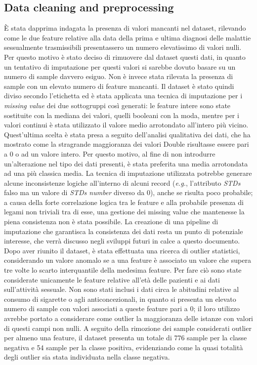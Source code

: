 \subsection{Data cleaning and preprocessing}
È stata dapprima indagata la presenza di valori mancanti nel dataset, rilevando come le due feature relative alla data della prima e ultima diagnosi delle malattie sessualmente trasmissibili presentassero un numero elevatissimo di valori nulli.
Per questo motivo è stato deciso di rimuovere dal dataset questi dati, in quanto un tentativo di imputazione per questi valori si sarebbe dovuto basare su un numero di sample davvero esiguo. Non è invece stata rilevata la presenza di sample con un elevato numero di feature mancanti.
Il dataset è stato quindi diviso secondo l'etichetta ed è stata applicata una tecnica di imputazione per i \textit{missing value} dei due sottogruppi così generati: le feature intere sono state sostituite con la mediana dei valori, quelli booleani con la moda, mentre per i valori continui è stata utilizzato il valore medio arrotondato all'intero più vicino.
Quest'ultima scelta è stata presa a seguito dell'analisi qualitativa dei dati, che ha mostrato come la stragrande maggioranza dei valori Double risultasse essere pari a 0 o ad un valore intero.
Per questo motivo, al fine di non introdurre un'alterazione nel tipo dei dati presenti, è stata preferita una media arrotondata ad una più classica media.
La tecnica di imputazione utilizzata potrebbe generare alcune inconsistenze logiche all'interno di alcuni record (\textit{e.g.}, l'attributo \textit{STDs} falso ma un valore di \textit{STDs number} diverso da 0), anche se risulta poco probabile; a causa della forte correlazione logica tra le feature e alla probabile presenza di legami non triviali tra di esse, una gestione dei missing value che mantenesse la piena consistenza non è stata possibile. 
La creazione di una pipeline di imputazione che garantisca la consistenza dei dati resta un punto di potenziale interesse, che verrà discusso negli sviluppi futuri in calce a questo documento.
Dopo aver riunito il dataset, è stata effettuata una ricerca di outlier statistici, considerando un valore anomalo se a una feature è associato un valore che supera tre volte lo scarto interquantile della medesima feature.
Per fare ciò sono state considerate unicamente le feature relative all'età delle pazienti e ai dati sull'attività sessuale. Non sono stati inclusi i dati circa le abitudini relative al consumo di sigarette o agli anticoncezionali, in quanto si presenta un elevato numero di sample con valori associati a queste feature pari a $0$; il loro utilizzo avrebbe portato a considerare come outlier la maggioranza delle istanze con valori di questi campi non nulli.
A seguito della rimozione dei sample considerati outlier per almeno una feature, il dataset presenta un totale di 776 sample per la classe negativa e 54 sample per la classe positiva, evidenziando come la quasi totalità degli outlier sia stata individuata nella classe negativa.